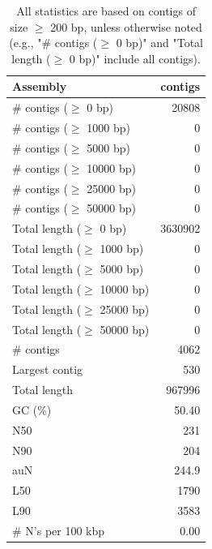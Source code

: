 \documentclass[12pt,a4paper]{article}
\begin{document}
\begin{table}[ht]
\begin{center}
\caption{All statistics are based on contigs of size $\geq$ 200 bp, unless otherwise noted (e.g., "\# contigs ($\geq$ 0 bp)" and "Total length ($\geq$ 0 bp)" include all contigs).}
\begin{tabular}{|l*{1}{|r}|}
\hline
Assembly & contigs \\ \hline
\# contigs ($\geq$ 0 bp) & 20808 \\ \hline
\# contigs ($\geq$ 1000 bp) & 0 \\ \hline
\# contigs ($\geq$ 5000 bp) & 0 \\ \hline
\# contigs ($\geq$ 10000 bp) & 0 \\ \hline
\# contigs ($\geq$ 25000 bp) & 0 \\ \hline
\# contigs ($\geq$ 50000 bp) & 0 \\ \hline
Total length ($\geq$ 0 bp) & 3630902 \\ \hline
Total length ($\geq$ 1000 bp) & 0 \\ \hline
Total length ($\geq$ 5000 bp) & 0 \\ \hline
Total length ($\geq$ 10000 bp) & 0 \\ \hline
Total length ($\geq$ 25000 bp) & 0 \\ \hline
Total length ($\geq$ 50000 bp) & 0 \\ \hline
\# contigs & 4062 \\ \hline
Largest contig & 530 \\ \hline
Total length & 967996 \\ \hline
GC (\%) & 50.40 \\ \hline
N50 & 231 \\ \hline
N90 & 204 \\ \hline
auN & 244.9 \\ \hline
L50 & 1790 \\ \hline
L90 & 3583 \\ \hline
\# N's per 100 kbp & 0.00 \\ \hline
\end{tabular}
\end{center}
\end{table}
\end{document}
